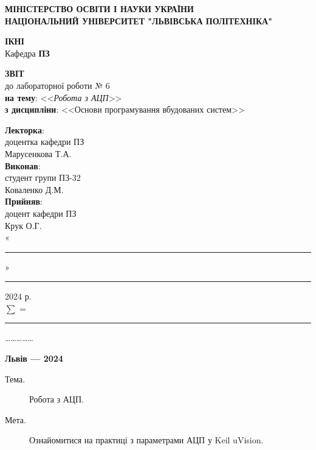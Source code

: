 \documentclass[oneside,14pt]{extarticle}
\newcommand\subject{Основи програмування вбудованих систем}
\newcommand\lecturer{доцентка кафедри ПЗ\\Марусенкова Т.А.}
\newcommand\teacher{доцент кафедри ПЗ\\Крук О.Г.}
\newcommand\mygroup{ПЗ-32}
\newcommand\lab{6}
\newcommand\theme{Робота з АЦП}
\newcommand\purpose{Ознайомитися на практиці з параметрами АЦП у Keil uVision}
\begin{document}
\begin{normalsize}
	\begin{titlepage}
		\thispagestyle{empty}
		\begin{center}
			\textbf{МІНІСТЕРСТВО ОСВІТИ І НАУКИ УКРАЇНИ\\
				НАЦІОНАЛЬНИЙ УНІВЕРСИТЕТ "ЛЬВІВСЬКА ПОЛІТЕХНІКА"}
		\end{center}
		\begin{flushright}
			\textbf{ІКНІ}\\
			Кафедра \textbf{ПЗ}
		\end{flushright}
		\vspace{80pt}
		\begin{center}
			\textbf{ЗВІТ}\\
			\vspace{10pt}
			до лабораторної роботи № \lab\\
			\textbf{на тему}: <<\textit{\theme}>>\\
			\textbf{з дисципліни}: <<\subject>>
		\end{center}
		\vspace{80pt}
		\begin{flushright}
			
			\textbf{Лекторка}:\\
			\lecturer\\
			\vspace{28pt}
			\textbf{Виконав}:\\
			
			студент групи \mygroup\\
			Коваленко Д.М.\\
			\vspace{28pt}
			\textbf{Прийняв}:\\
			
			\teacher\\
			
			\vspace{28pt}
			«\rule{1cm}{0.15mm}» \rule{1.5cm}{0.15mm} 2024 р.\\
			$\sum$ = \rule{1cm}{0.15mm}……………\\
			
		\end{flushright}
		\vspace{\fill}
		\begin{center}
			\textbf{Львів — 2024}
		\end{center}
	\end{titlepage}
		
	\begin{description}
		\item[Тема.] \theme.
		\item[Мета.] \purpose.
	\end{description}


\end{normalsize}
\end{document}
